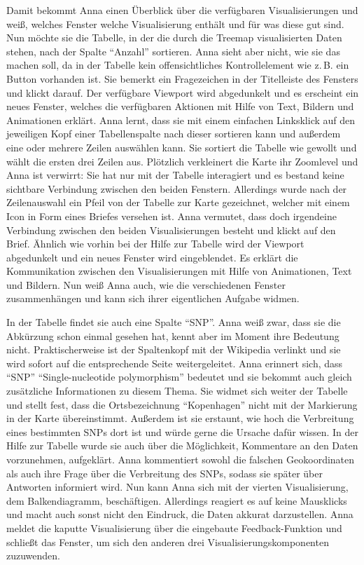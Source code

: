 \documentclass[
	headsepline,
	footsepline,
	fontsize=12pt,
	bibliography=totoc
]{scrbook}
\begin{document}
Damit bekommt Anna einen Überblick über die verfügbaren Visualisierungen und weiß, welches Fenster welche Visualisierung enthält und für was diese gut sind. Nun möchte sie die Tabelle, in der die durch die Treemap visualisierten Daten stehen, nach der Spalte \enquote{Anzahl} sortieren. Anna sieht aber nicht, wie sie das machen soll, da in der Tabelle kein offensichtliches Kontrollelement wie z.\,B. ein Button vorhanden ist. Sie bemerkt ein Fragezeichen in der Titelleiste des Fensters und klickt darauf. Der verfügbare Viewport wird abgedunkelt und es erscheint ein neues Fenster, welches die verfügbaren Aktionen mit Hilfe von Text, Bildern und Animationen erklärt. Anna lernt, dass sie mit einem einfachen Linksklick auf den jeweiligen Kopf einer Tabellenspalte nach dieser sortieren kann und außerdem eine oder mehrere Zeilen auswählen kann. Sie sortiert die Tabelle wie gewollt und wählt die ersten drei Zeilen aus. Plötzlich verkleinert die Karte ihr Zoomlevel und Anna ist verwirrt: Sie hat nur mit der Tabelle interagiert und es bestand keine sichtbare Verbindung zwischen den beiden Fenstern. Allerdings wurde nach der Zeilenauswahl ein Pfeil von der Tabelle zur Karte gezeichnet, welcher mit einem Icon in Form eines Briefes versehen ist. Anna vermutet, dass doch irgendeine Verbindung zwischen den beiden Visualisierungen besteht und klickt auf den Brief. Ähnlich wie vorhin bei der Hilfe zur Tabelle wird der Viewport abgedunkelt und ein neues Fenster wird eingeblendet. Es erklärt die Kommunikation zwischen den Visualisierungen mit Hilfe von Animationen, Text und Bildern. Nun weiß Anna auch, wie die verschiedenen Fenster zusammenhängen und kann sich ihrer eigentlichen Aufgabe widmen.


In der Tabelle findet sie auch eine Spalte \enquote{SNP}. Anna weiß zwar, dass sie die Abkürzung schon einmal gesehen hat, kennt aber im Moment ihre Bedeutung nicht. Praktischerweise ist der Spaltenkopf mit der Wikipedia verlinkt und sie wird sofort auf die entsprechende Seite weitergeleitet. Anna erinnert sich, dass \enquote{SNP} \enquote{Single-nucleotide polymorphism} bedeutet und sie bekommt auch gleich zusätzliche Informationen zu diesem Thema. Sie widmet sich weiter der Tabelle und stellt fest, dass die Ortsbezeichnung \enquote{Kopenhagen} nicht mit der Markierung in der Karte übereinstimmt. Außerdem ist sie erstaunt, wie hoch die Verbreitung eines bestimmten SNPs dort ist und würde gerne die Ursache dafür wissen. In der Hilfe zur Tabelle wurde sie auch über die Möglichkeit, Kommentare an den Daten vorzunehmen, aufgeklärt. Anna kommentiert sowohl die falschen Geokoordinaten als auch ihre Frage über die Verbreitung des SNPs, sodass sie später über Antworten informiert wird. Nun kann Anna sich mit der vierten Visualisierung, dem Balkendiagramm, beschäftigen. Allerdings reagiert es auf keine Mausklicks und macht auch sonst nicht den Eindruck, die Daten akkurat darzustellen. Anna meldet die kaputte Visualisierung über die eingebaute Feedback-Funktion und schließt das Fenster, um sich den anderen drei Visualisierungskomponenten zuzuwenden.
\end{document}
